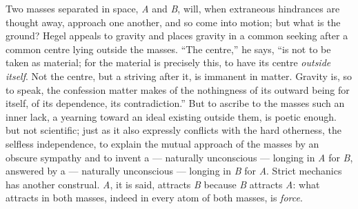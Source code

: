 \documentclass[12pt,a4paper]{book}
\begin{document}
Two masses separated in space, \textit{A} and \textit{B}, will, when extraneous
hindrances are thought away, approach one another, and so come into motion; but what is
the ground? Hegel appeals to gravity and places gravity in a common seeking after a
common centre lying outside the masses. ``The centre,'' he says, ``is not to be taken as
material; for the material is precisely this, to have its centre \emph{outside itself}.
Not the centre, but a striving after it, is immanent in matter. Gravity is, so to speak,
the confession matter makes of the nothingness of its outward being for itself, of its
dependence, its contradiction.'' But to ascribe to the masses such an inner lack, a
yearning toward an ideal existing outside them, is poetic enough. but
not scientific; just as it also expressly conflicts with the hard otherness, the selfless
independence, to explain the mutual approach of the masses by an obscure sympathy and to
invent a --- naturally unconscious --- longing in \textit{A} for \textit{B}, answered by
a --- naturally unconscious --- longing in \textit{B} for \textit{A}. Strict mechanics
has another construal. \textit{A}, it is said, attracts \textit{B} because \textit{B}
attracts \textit{A}: what attracts in both masses, indeed in every atom of both masses,
is \emph{force}.
\end{document}
